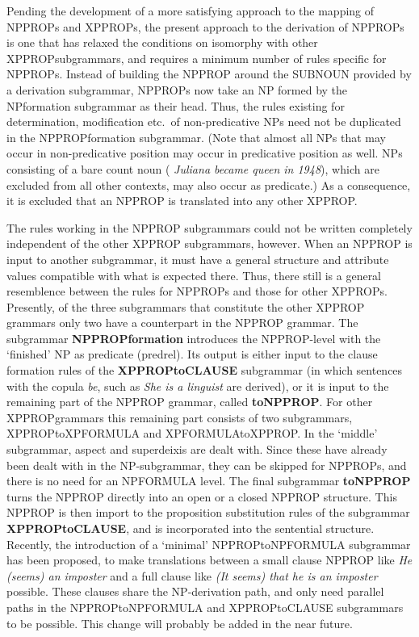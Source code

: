Pending the development of a more satisfying approach to the mapping of 
NPPROPs and XPPROPs,  the present approach to the derivation of 
NPPROPs is one that has relaxed the conditions on isomorphy with other 
XPPROPsubgrammars, and requires a minimum number of rules specific for 
NPPROPs. Instead of building the NPPROP around the SUBNOUN provided by a 
derivation subgrammar, NPPROPs now take an NP formed by the NPformation 
subgrammar as their head. Thus, the rules existing for determination, 
modification etc.\ of 
non-predicative NPs need not be duplicated in the NPPROPformation subgrammar.
(Note that almost all NPs that may occur 
in non-predicative position may occur in predicative position as well. 
NPs consisting of a bare count noun ({\em 
Juliana  became queen in 1948}), which are excluded from all other contexts, may
also occur as predicate.) 
As a consequence, it is excluded that an NPPROP is translated into 
any other XPPROP. 

The rules working in the NPPROP subgrammars could not be written completely 
independent of the other XPPROP subgrammars, however. When an NPPROP is input 
to another subgrammar, it must have a general structure and attribute values 
compatible with what is expected there. Thus, there still is a general 
resemblence between the rules for NPPROPs and those for other XPPROPs.
Presently, of the three subgrammars that constitute the other XPPROP grammars 
only two have a counterpart in the NPPROP grammar.
The subgrammar {\bf NPPROPformation} introduces the NPPROP-level with the 
`finished' NP as predicate (predrel). 
Its output is either input to the clause formation rules of the 
{\bf XPPROPtoCLAUSE} subgrammar 
(in which sentences with the copula {\em be\/}, 
such as {\em She is a linguist\/} are derived), or 
it is input to the remaining part of the NPPROP grammar, called {\bf toNPPROP}.
For other XPPROPgrammars this remaining part consists of two subgrammars, 
XPPROPtoXPFORMULA and XPFORMULAtoXPPROP. In the `middle' subgrammar, aspect and 
superdeixis are dealt with. Since these have already been dealt with in the 
NP-subgrammar, they can be skipped for NPPROPs, and there is no need for an 
NPFORMULA 
level. The final subgrammar {\bf toNPPROP} turns the NPPROP directly into 
an open or a closed NPPROP structure.
This NPPROP is then import to the proposition substitution rules of
the subgrammar {\bf XPPROPtoCLAUSE}, and is incorporated into the sentential 
structure. Recently, the introduction of a `minimal' NPPROPtoNPFORMULA 
subgrammar has been proposed, to make translations between a small clause 
NPPROP like {\em He (seems) an imposter\/} and a full clause like {\em (It 
seems) that he is an imposter\/} possible. These clauses share the 
NP-derivation 
path, and only need parallel paths in the NPPROPtoNPFORMULA and XPPROPtoCLAUSE 
subgrammars to be possible. This change will probably be added in the near 
future.


